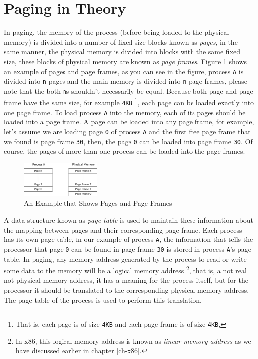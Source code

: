 \section{Paging in Theory}\label{paging-in-theory}

In paging, the memory of the process (before being loaded to the
physical memory) is divided into a number of fixed size blocks known as
\emph{pages}, in the same manner, the physical memory is divided into
blocks with the same fixed size, these blocks of physical memory are
known as \emph{page frames}. Figure \ref{fig:28092021_0} shows an
example of pages and page frames, as you can see in the figure, process
\lstinline!A! is divided into \lstinline!n! pages and the main memory is
divided into \lstinline!n! page frames, please note that the both
\lstinline!n!s shouldn't necessarily be equal. Because both page and
page frame have the same size, for example \lstinline!4KB! \footnote{That
  is, each page is of size \lstinline!4KB! and each page frame is of
  size \lstinline!4KB!,}, each page can be loaded exactly into one page
frame. To load process \lstinline!A! into the memory, each of its pages
should be loaded into a page frame. A page can be loaded into any page
frame, for example, let's assume we are loading page \lstinline!0! of
process \lstinline!A! and the first free page frame that we found is
page frame \lstinline!30!, then, the page \lstinline!0! can be loaded
into page frame \lstinline!30!. Of course, the pages of more than one
process can be loaded into the page frames.

\begin{figure}
\centering
\includegraphics[width=0.35000\textwidth]{Figures/memory-ch/Fig28092021_0.png}
\caption{An Example that Shows Pages and Page
Frames}\label{fig:28092021_0}
\end{figure}

A data structure known as \emph{page table} is used to maintain these
information about the mapping between pages and their corresponding page
frame. Each process has its own page table, in our example of process
\lstinline!A!, the information that tells the processor that page
\lstinline!0! can be found in page frame \lstinline!30! is stored in
process \lstinline!A!'s page table. In paging, any memory address
generated by the process to read or write some data to the memory will
be a logical memory address \footnote{In x86, this logical memory
  address is known as \emph{linear memory address} as we have discussed
  earlier in chapter \ref{ch-x86}.}, that is, a not real not physical
memory address, it has a meaning for the process itself, but for the
processor it should be translated to the corresponding physical memory
address. The page table of the process is used to perform this
translation.

